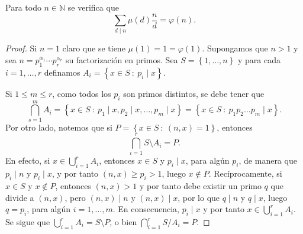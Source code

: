 \begin{proposition}\label{prop:mob1}
Para todo $n\in\mathbb{N}$ se verifica que 
\begin{equation*}
	\sum_{d \mid n} \mu(d)\frac{n}{d}=\varphi(n).
\end{equation*}
\end{proposition}
\begin{proof}
Si $n=1$ claro que se tiene $\mu(1) = 1 = \varphi(1)$. Supongamos que $n>1$ y sea $n=p_1^{\alpha_1}\cdots p_r^{\alpha_r}$ su factorización en primos. Sea $S=\left\{1,\ldots,n\right\}$ y para cada $i=1,\ldots,r$ definamos $A_i=\left\{x\in S\: : \: p_i \mid x\right\}$.
\bigskip

Si $1\leq m\leq r$, como todos los $p_i$ son primos distintos, se debe tener que 
\begin{equation*}
	\bigcap_{s=1}^{m} A_i = \left\{x\in S \: : \: p_1 \mid x,p_2 \mid x,\ldots,p_m \mid x\right\}=\left\{x\in S \: : \: p_1 p_2 \ldots p_m \mid x\right\}.
\end{equation*}
Por otro lado, notemos que si $P=\left\{x\in S \: : \: (n,x)=1\right\}$, entonces 
\begin{equation*}
	\bigcap_{i=1}^{r} S \setminus A_i=P.
\end{equation*}
En efecto, si $x\in \bigcup_{i=1}^{r} A_i$, entonces $x\in S$ y $p_i \mid x$, para algún $p_i$, de manera que $p_i \mid n$ y $p_i \mid x$, y por tanto $(n,x)\geq p_i>1$, luego $x\not\in P$. Recíprocamente, si $x\in S$ y $x\not\in P$, entonces $(n,x)>1$ y por tanto debe existir un primo $q$ que divide a $(n,x)$, pero $(n,x)\mid n$ y $(n,x)\mid x$, por lo que $q \mid n$ y $q \mid x$, luego $q=p_i$, para algún $i=1,\ldots,m$. En consecuencia, $p_i \mid x$ y por tanto $x\in \bigcup_{i=1}^{r} A_i$. Se sigue que $\bigcup_{i=1}^{r} A_i=S \setminus P$, o bien $\bigcap_{i=1}^{r} S/A_i=P$.
\bigskip


\end{proof}
